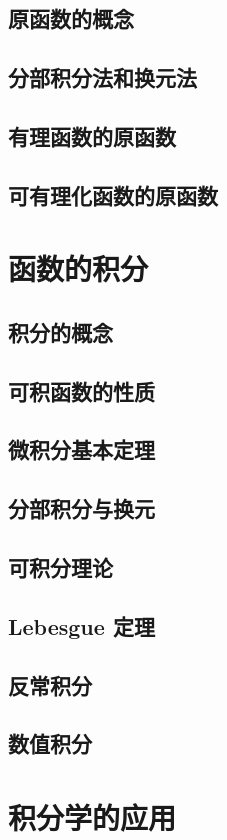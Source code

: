 \documentclass[a4paper, 12pt]{ctexbook}
\begin{document}
        \section{原函数的概念}
        \section{分部积分法和换元法}
        \section{有理函数的原函数}
        \section{可有理化函数的原函数}
    \chapter{函数的积分}
        \section{积分的概念}
        \section{可积函数的性质}
        \section{微积分基本定理}
        \section{分部积分与换元}
        \section{可积分理论}
        \section{Lebesgue 定理}
        \section{反常积分}
        \section{数值积分}
    \chapter{积分学的应用}
\end{document}
